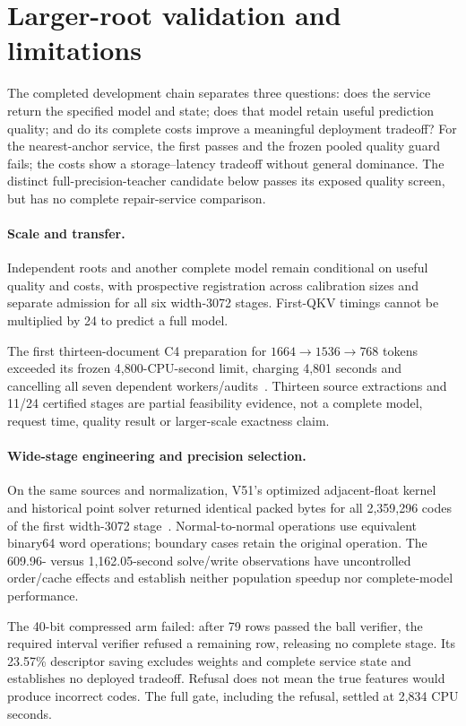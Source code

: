 \documentclass[10pt,twocolumn,letterpaper]{article}
\begin{document}
\section{Larger-root validation and limitations}
The completed development chain separates three questions: does the service
return the specified model and state; does that model retain useful prediction
quality; and do its complete costs improve a meaningful deployment tradeoff?
For the nearest-anchor service, the first passes and the frozen pooled quality
guard fails; the costs show a storage--latency tradeoff without general dominance.
The distinct full-precision-teacher candidate below passes its exposed quality
screen, but has no complete repair-service comparison.

\paragraph{Scale and transfer.}
Independent roots and another complete model remain conditional on useful
quality and costs, with prospective registration across calibration sizes and
separate admission for all six width-3072 stages. First-QKV timings cannot be
multiplied by 24 to predict a full model.

The first thirteen-document C4 preparation for $1664\to1536\to768$ tokens
exceeded its frozen 4,800-CPU-second limit, charging 4,801 seconds and cancelling
all seven dependent workers/audits~\cite{v49failure}. Thirteen source extractions
and 11/24 certified stages are partial feasibility evidence, not a complete
model, request time, quality result or larger-scale exactness claim.

\paragraph{Wide-stage engineering and precision selection.}
On the same sources and normalization, V51's optimized adjacent-float kernel
and historical point solver returned identical packed bytes for all 2,359,296
codes of the first width-3072 stage~\cite{v51}. Normal-to-normal operations use
equivalent binary64 word operations; boundary cases retain the original operation.
The 609.96- versus 1,162.05-second solve/write observations have uncontrolled
order/cache effects and establish neither population speedup nor complete-model
performance.

The 40-bit compressed arm failed: after 79 rows passed the ball verifier, the
required interval verifier refused a remaining row, releasing no complete stage.
Its 23.57\% descriptor saving excludes weights and complete service state and
establishes no deployed tradeoff. Refusal does not mean the true features would
produce incorrect codes. The full gate, including the refusal, settled at 2,834
CPU seconds.
\end{document}
